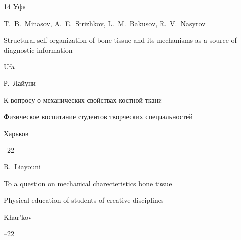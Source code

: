 \begin{thebibliography}{14}
\publaddr Уфа



\misctransl

\by T.~B.~Minasov, A.~E.~Strizhkov, L.~M.~Bakusov, R.~V.~Nasyrov 

\book Structural self-organization of bone tissue and its mechanisms as a source of diagnostic information

\publaddr Ufa  




\by Р.~Лайуни 

\paper К вопросу о механических свойствах костной ткани

\inbook Физическое воспитание студентов творческих специальностей

\publaddr Харьков



--22

\misctransl

\by R.~Liayouni

\paper  To a question on mechanical charecteristics bone tissue 

\inbook Physical education of students of creative disciplines

\publaddr Khar'kov



--22



\end{thebibliography}





\noindent

\hskip6.5cm \thedate \par\noindent

\hskip6.5cm\therevdate








\newpage






\makeengtitlem



 \newpage

%


%

%

